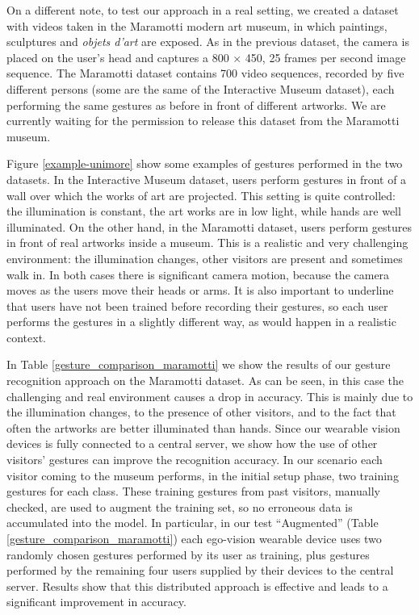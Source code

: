 On a different note, to test our approach in a real setting, we created a dataset with videos taken in the Maramotti modern art museum, in which paintings, sculptures and \textit{objets d'art} are exposed. As in the previous dataset, the camera is placed on the user's head and captures a 800 $\times$ 450, 25 frames per second image sequence. The Maramotti dataset contains 700 video sequences, recorded by five different persons (some are the same of the Interactive Museum dataset), each performing the same gestures as before in front of different artworks. We are currently waiting for the permission to release this dataset from the Maramotti museum.
   
Figure \ref{example-unimore} show some examples of gestures performed in the two datasets. In the Interactive Museum dataset, users perform gestures in front of a wall over which the works of art are projected. This setting is quite controlled: the illumination is constant, the art works are in low light, while hands are well illuminated. On the other hand, in the Maramotti dataset, users perform gestures in front of real artworks inside a museum. This is a realistic and very challenging environment: the illumination changes, other visitors are present and sometimes walk in. In both cases there is significant camera motion, because the camera moves as the users move their heads or arms. It is also important to underline that users have not been trained before recording their gestures, so each user performs the gestures in a slightly different way, as would happen in a realistic context.  

In Table \ref{gesture_comparison_maramotti} we show the results of our gesture recognition approach on the Maramotti dataset. As can be seen, in this case the challenging and real environment causes a drop in accuracy. This is mainly due to the illumination changes, to the presence of other visitors, and to the fact that often the artworks are better illuminated than hands.
Since our wearable vision devices is fully connected to a central server, we show how the use of other visitors' gestures can improve the recognition accuracy.
In our scenario each visitor coming to the museum performs, in the initial setup phase, two training gestures for each class. These training gestures from past visitors, manually checked, are used to augment the training set, so no erroneous data is accumulated into the model. In particular, in our test ``Augmented'' (Table \ref{gesture_comparison_maramotti}) each ego-vision wearable device uses two randomly chosen gestures performed by its user as training, plus gestures performed by the remaining four users supplied by their devices to the central server. Results show that this distributed approach is effective and leads to a significant improvement in accuracy.


